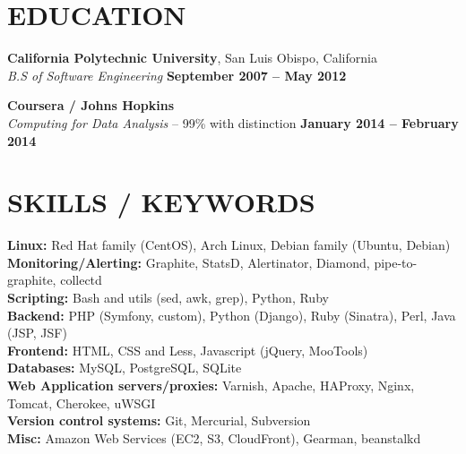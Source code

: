 \documentclass[margin,line]{resume}
\begin{document}
\begin{resume}
    \vspace{-4mm}

\sectionline

    \section{\mysidestyle \textbf{\large{E}\small{DUCATION}}}

    \textbf{\listing California Polytechnic University}, San Luis Obispo, California \vspace{1mm}\\
    \textsl{B.S of Software Engineering} \hfill \textbf{September 2007 -- May 2012}\vspace{-3mm}\\\vspace{-1mm}%

    \textbf{\listing Coursera / Johns Hopkins} \vspace{1mm}\\
    \textsl{Computing for Data Analysis} -- 99\% with distinction \hfill \textbf{January 2014 -- February 2014}\vspace{-3mm}\\\vspace{-1mm}%

    \vspace{-1mm}

\sectionline

    \section{\mysidestyle \textbf{\large{S}\small{KILLS} / \large{K}\small{EYWORDS}}}

    \textbf{Linux:} Red Hat family (CentOS), Arch Linux, Debian family (Ubuntu, Debian)\\
    \textbf{Monitoring/Alerting:} Graphite, StatsD, Alertinator, Diamond, pipe-to-graphite, collectd\\
    \textbf{Scripting:} Bash and utils (sed, awk, grep), Python, Ruby\\
    \textbf{Backend:} PHP (Symfony, custom), Python (Django), Ruby (Sinatra), Perl, Java (JSP, JSF)\\
    \textbf{Frontend:} HTML, CSS and Less, Javascript (jQuery, MooTools)\\
    \textbf{Databases:} MySQL, PostgreSQL, SQLite\\
    \textbf{Web Application servers/proxies:} Varnish, Apache, HAProxy, Nginx, Tomcat, Cherokee, uWSGI\\
    \textbf{Version control systems:} Git, Mercurial, Subversion\\
    \textbf{Misc:} Amazon Web Services (EC2, S3, CloudFront), Gearman, beanstalkd



\end{resume}
\end{document}
